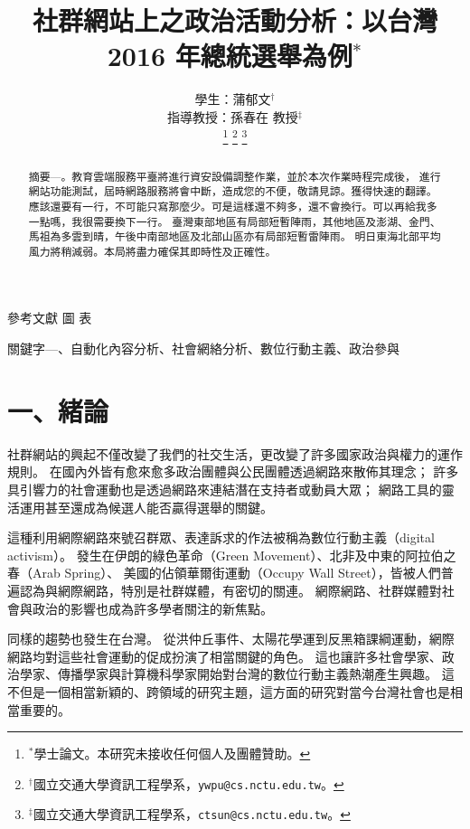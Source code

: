 \documentclass[letterpaper, 10pt, conference]{ieeeconf}   %
\title{\LARGE \bf
社群網站上之政治活動分析：以台灣 2016 年總統選舉為例$^{\ast}$
}
\author{\parbox{3 in}{\centering 學生：蒲郁文$^{\dagger}$}
        \hspace*{0.5 in}
        \parbox{3 in}{\centering 指導教授：孫春在 教授$^{\ddagger}$}
        \thanks{$^{\ast}$學士論文。本研究未接收任何個人及團體贊助。}
        \thanks{$^{\dagger}$國立交通大學資訊工程學系，{\tt\small ywpu@cs.nctu.edu.tw}。}
        \thanks{$^{\ddagger}$國立交通大學資訊工程學系，{\tt\small ctsun@cs.nctu.edu.tw}。}
}
\begin{document}
\begin{CJK}{UTF8}{bsmi}
\onehalfspacing
\refname{參考文獻}
\figurename{圖}
\tablename{表}

\maketitle
\thispagestyle{empty}
\pagestyle{empty}


\begin{abstract}
摘要\enskip---。教育雲端服務平臺將進行資安設備調整作業，並於本次作業時程完成後，%
進行網站功能測試，屆時網路服務將會中斷，造成您的不便，敬請見諒。獲得快速的翻譯。%
應該還要有一行，不可能只寫那麼少。可是這樣還不夠多，還不會換行。可以再給我多一點嗎，我很需要換下一行。%
臺灣東部地區有局部短暫陣雨，其他地區及澎湖、金門、馬祖為多雲到晴，午後中南部地區及北部山區亦有局部短暫雷陣雨。%
明日東海北部平均風力將稍減弱。本局將盡力確保其即時性及正確性。%
\end{abstract}

\begin{keywords}
關鍵字\enskip---、自動化內容分析、社會網絡分析、數位行動主義、政治參與%
\end{keywords}


\section*{一、緒論}

社群網站的興起不僅改變了我們的社交生活，更改變了許多國家政治與權力的運作規則。%
在國內外皆有愈來愈多政治團體與公民團體透過網路來散佈其理念；%
許多具引響力的社會運動也是透過網路來連結潛在支持者或動員大眾；%
網路工具的靈活運用甚至還成為候選人能否贏得選舉的關鍵。%

這種利用網際網路來號召群眾、表達訴求的作法被稱為數位行動主義（digital activism）。%
發生在伊朗的綠色革命（Green Movement）、北非及中東的阿拉伯之春（Arab Spring）、%
美國的佔領華爾街運動（Occupy Wall Street），皆被人們普遍認為與網際網路，特別是社群媒體，有密切的關連。%
網際網路、社群媒體對社會與政治的影響也成為許多學者關注的新焦點。%

同樣的趨勢也發生在台灣。%
從洪仲丘事件、太陽花學運到反黑箱課綱運動，網際網路均對這些社會運動的促成扮演了相當關鍵的角色。%
這也讓許多社會學家、政治學家、傳播學家與計算機科學家開始對台灣的數位行動主義熱潮產生興趣。%
這不但是一個相當新穎的、跨領域的研究主題，這方面的研究對當今台灣社會也是相當重要的。%


\end{CJK}
\end{document}
